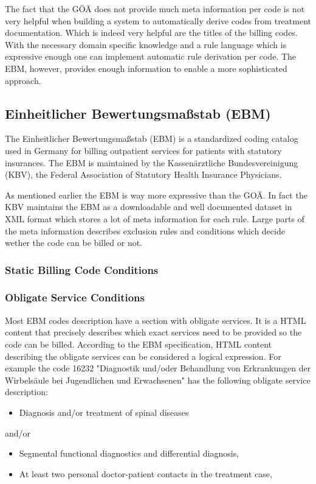 The fact that the GÖÄ does not provide much meta information per code is not very helpful when building a system to automatically derive codes from treatment documentation.
Which is indeed very helpful are the titles of the billing codes.
With the necessary domain specific knowledge and a rule language which is expressive enough one can implement automatic rule derivation per code.
The EBM, however, provides enough information to enable a more sophisticated approach.


\subsection{Einheitlicher Bewertungsmaßstab (EBM)}
The Einheitlicher Bewertungsmaßstab (EBM) is a standardized coding catalog used in Germany for billing outpatient services for patients with statutory insurances.
The EBM is maintained by the Kassenärztliche Bundesvereinigung (KBV), the Federal Association of Statutory Health Insurance Physicians.

As mentioned earlier the EBM is way more expressive than the GOÄ.
In fact the KBV maintains the EBM as a downloadable and well documented dataset in XML format which stores a lot of meta information for each rule.
Large parts of the meta information describes exclusion rules and conditions which decide wether the code can be billed or not.

\subsubsection{Static Billing Code Conditions}


\subsubsection{Obligate Service Conditions}
Most EBM codes description have a section with obligate services.
It is a HTML content that precisely describes which exact services need to be provided so the code can be billed.
According to the EBM specification, HTML content describing the obligate services can be considered a logical expression.
For example the code 16232 "Diagnostik und/oder Behandlung von Erkrankungen der Wirbelsäule bei Jugendlichen und Erwachsenen" has the following obligate service description:


\begin{itemize}
    \item Diagnosis and/or treatment of spinal diseases
\end{itemize}
and/or
\begin{itemize}
    \item Segmental functional diagnostics and differential diagnosis,
    \item At least two personal doctor-patient contacts in the treatment case,
\end{itemize}

